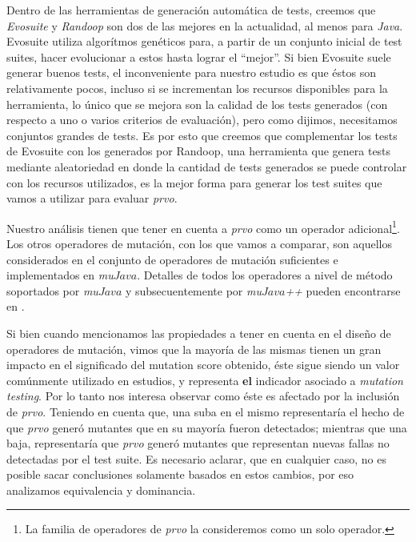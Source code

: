 Dentro de las herramientas de generaci\'on autom\'atica de tests, creemos que \emph{Evosuite} y \emph{Randoop} son dos de las mejores en la actualidad, al menos para \emph{Java}. Evosuite utiliza algor\'itmos gen\'eticos para, a partir de un conjunto inicial de test suites, hacer evolucionar a estos hasta lograr el ``mejor''. Si bien Evosuite suele generar buenos tests, el inconveniente para nuestro estudio es que \'estos son relativamente pocos, incluso si se incrementan los recursos disponibles para la herramienta, lo \'unico que se mejora son la calidad de los tests generados (con respecto a uno o varios criterios de evaluaci\'on), pero como dijimos, necesitamos conjuntos grandes de tests. Es por esto que creemos que complementar los tests de Evosuite con los generados por Randoop, una herramienta que genera tests mediante aleatoriedad en donde la cantidad de tests generados se puede controlar con los recursos utilizados, es la mejor forma para generar los test suites que vamos a utilizar para evaluar \emph{prvo}.

Nuestro an\'alisis tienen que tener en cuenta a \emph{prvo} como un operador adicional\footnote{La familia de operadores de \emph{prvo} la consideremos como un solo operador.}. Los otros operadores de mutaci\'on, con los que vamos a comparar, son aquellos considerados en el conjunto de operadores de mutaci\'on suficientes \cite{bibliography.mutation.selection.Offutt96, bibliography.mutation.selection.ASN2008} e implementados en \emph{mu$Java$}. Detalles de todos los operadores a nivel de m\'etodo soportados por \emph{mu$Java$} y subsecuentemente por \emph{mu$Java$++} pueden encontrarse en \cite{muJavaMOPS}. 

Si bien cuando mencionamos las propiedades a tener en cuenta en el dise\~no de operadores de mutaci\'on, vimos que la mayor\'ia de las mismas tienen un gran impacto en el significado del mutation score obtenido, \'este sigue siendo un valor com\'unmente utilizado en estudios, y representa \textbf{el} indicador asociado a \emph{mutation testing}. Por lo tanto nos interesa observar como \'este es afectado por la inclusi\'on de \emph{prvo}. Teniendo en cuenta que, una suba en el mismo representar\'ia el hecho de que \emph{prvo} gener\'o mutantes que en su mayor\'ia fueron detectados; mientras que una baja, representar\'ia que \emph{prvo} gener\'o mutantes que representan nuevas fallas no detectadas por el test suite. Es necesario aclarar, que en cualquier caso, no es posible sacar conclusiones solamente basados en estos cambios, por eso analizamos equivalencia y dominancia.

